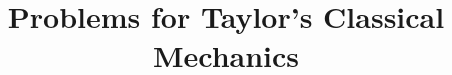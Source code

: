 \documentclass{article}
\author{}
\date{}
\title{Problems for Taylor's Classical Mechanics}
\begin{document}
\maketitle
\tableofcontents
\pagebreak


\newpage


\newpage


\newpage


\end{document}
